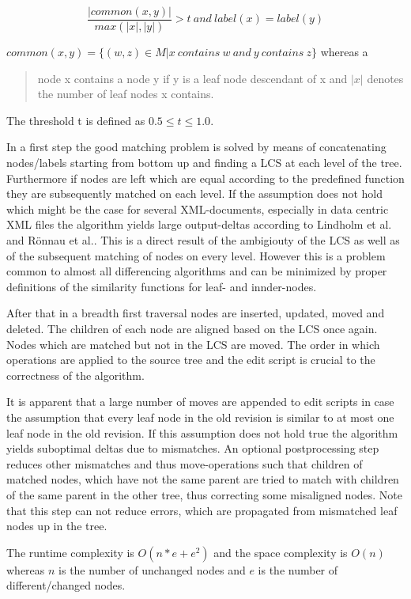 \begin{equation}
\frac{|common(x, y)|}{max(|x|,|y|)} > t\ and\ label(x) = label(y)
\end{equation}

$common(x,y) = \{(w,z) \in M | x\ contains\ w\ and\ y\ contains\ z\}$ whereas a \begin{quote}node x contains a node y if y is a leaf node descendant of x and $|x|$ denotes the number of leaf nodes x contains.\end{quote} The threshold t is defined as $0.5 \leq t \leq 1.0$.

In a first step the good matching problem is solved by means of concatenating nodes/labels starting from bottom up and finding a LCS at each level of the tree. Furthermore if nodes are left which are equal according to the predefined function they are subsequently matched on each level. If the assumption does not hold which might be the case for several XML-documents, especially in data centric XML files the algorithm yields large output-deltas according to Lindholm et al.\cite{lindholm2006fast} and Rönnau et al.\cite{ronnau2009efficient}. This is a direct result of the ambigiouty of the LCS as well as of the subsequent matching of nodes on every level. However this is a problem common to almost all differencing algorithms and can be minimized by proper definitions of the similarity functions for leaf- and innder-nodes.

After that in a breadth first traversal nodes are inserted, updated, moved and deleted. The children of each node are aligned based on the LCS once again. Nodes which are matched but not in the LCS are moved. The order in which operations are applied to the source tree and the edit script is crucial to the correctness of the algorithm.

It is apparent that a large number of moves are appended to edit scripts in case the assumption that every leaf node in the old revision is similar to at most one leaf node in the old revision. If this assumption does not hold true the algorithm yields suboptimal deltas due to mismatches. An optional postprocessing step reduces other mismatches and thus move-operations such that children of matched nodes, which have not the same parent are tried to match with children of the same parent in the other tree, thus correcting some misaligned nodes. Note that this step can not reduce errors, which are propagated from mismatched leaf nodes up in the tree.

The runtime complexity is $O(n*e+e^2)$ and the space complexity is $O(n)$ whereas $n$ is the number of unchanged nodes and $e$ is the number of different/changed nodes.


